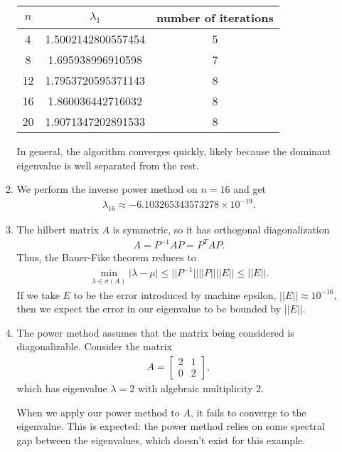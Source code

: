 \documentclass[10pt]{article}
\begin{document}
\begin{enumerate}
\begin{enumerate}
        \begin{center}
            \begin{tabular}{c | c | c}
                \(n\) & \(\lambda_1\) & number of iterations \\
                \hline
                4 & 1.5002142800557454 & 5 \\
                8 & 1.695938996910598 & 7 \\
                12 & 1.7953720595371143 & 8 \\
                16 & 1.860036442716032 & 8 \\
                20 & 1.9071347202891533 & 8 \\
            \end{tabular}
        \end{center}

        In general, the algorithm converges quickly, likely because the dominant eigenvalue is well separated from the rest.

        \item We perform the inverse power method on \(n=16\) and get \begin{align*}
            \lambda_{16} \approx -6.103265343573278 \times 10^{-19}.
        \end{align*}

        \item The hilbert matrix \(A\) is symmetric, so it has orthogonal diagonalization \begin{align*}
            A = P^{-1}AP = P^TAP.
        \end{align*} Thus, the Bauer-Fike theorem reduces to \begin{align*}
            \min_{\lambda \in \sigma(A)}|\lambda -\mu | \leq ||P^{-1}||||P||||E|| \leq ||E||.
        \end{align*} If we take \(E\) to be the error introduced by machine epsilon, \(||E|| \approx 10^{-16}\), then we expect the error in our eigenvalue to be bounded by \(||E||\).

        \item The power method assumes that the matrix being considered is diagonalizable. Consider the matrix \begin{align*}
            A = \begin{bmatrix}2 & 1 \\ 0 & 2\end{bmatrix},
        \end{align*} which has eigenvalue \(\lambda = 2\) with algebraic multiplicity 2.

        When we apply our power method to \(A\), it fails to converge to the eigenvalue. This is expected: the power method relies on some spectral gap between the eigenvalues, which doesn't exist for this example.

    \end{enumerate}

    {\small }
\end{enumerate}
\end{document}
